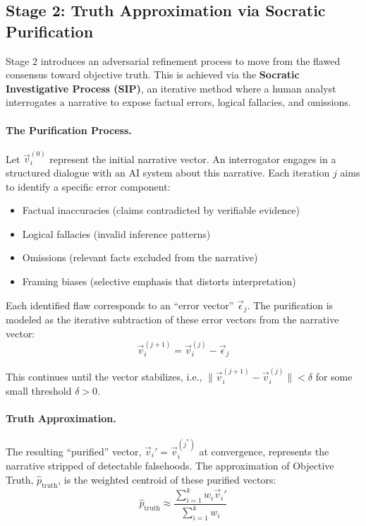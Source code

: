 \documentclass[11pt,a4paper]{article}
\begin{document}
\begin{small}
\subsection{Stage 2: Truth Approximation via Socratic Purification}

Stage 2 introduces an adversarial refinement process to move from the flawed consensus toward objective truth. This is achieved via the \textbf{Socratic Investigative Process (SIP)}, an iterative method where a human analyst interrogates a narrative to expose factual errors, logical fallacies, and omissions.

\paragraph{The Purification Process.} Let $\vec{v}_i^{(0)}$ represent the initial narrative vector. An interrogator engages in a structured dialogue with an AI system about this narrative. Each iteration $j$ aims to identify a specific error component:
\begin{itemize}
    \item Factual inaccuracies (claims contradicted by verifiable evidence)
    \item Logical fallacies (invalid inference patterns)
    \item Omissions (relevant facts excluded from the narrative)
    \item Framing biases (selective emphasis that distorts interpretation)
\end{itemize}

Each identified flaw corresponds to an ``error vector'' $\vec{\epsilon}_j$. The purification is modeled as the iterative subtraction of these error vectors from the narrative vector:
\begin{equation}
\vec{v}_i^{(j+1)} = \vec{v}_i^{(j)} - \vec{\epsilon}_j
\end{equation}

This continues until the vector stabilizes, i.e., $\|\vec{v}_i^{(j+1)} - \vec{v}_i^{(j)}\| < \delta$ for some small threshold $\delta > 0$.

\paragraph{Truth Approximation.} The resulting ``purified'' vector, $\vec{v}_i' = \vec{v}_i^{(j^*)}$ at convergence, represents the narrative stripped of detectable falsehoods. The approximation of Objective Truth, $\hat{p}_{\text{truth}}$, is the weighted centroid of these purified vectors:
\begin{equation}
\hat{p}_{\text{truth}} \approx \frac{\sum_{i=1}^{k} w_i \vec{v}_i'}{\sum_{i=1}^{k} w_i}
\end{equation}


\end{small}
\end{document}
